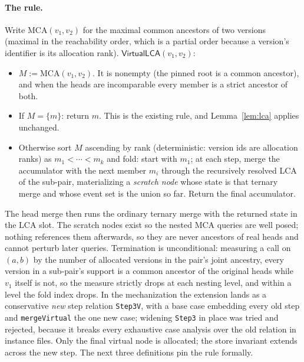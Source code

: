 \documentclass[11pt]{article}
\newcommand{\lean}[1]{\texttt{#1}}
\begin{document}
\paragraph{The rule.} Write $\mathrm{MCA}(v_1, v_2)$ for the maximal
common ancestors of two versions (maximal in the reachability order,
which is a partial order because a version's identifier is its
allocation rank). $\mathsf{VirtualLCA}(v_1, v_2)$:
\begin{itemize}[leftmargin=2em]
\item $M := \mathrm{MCA}(v_1, v_2)$. It is nonempty (the pinned root is
  a common ancestor), and when the heads are incomparable every member
  is a strict ancestor of both.
\item If $M = \{m\}$: return $m$. This is the existing rule, and
  Lemma~\ref{lem:lca} applies unchanged.
\item Otherwise sort $M$ ascending by rank (deterministic: version ids
  are allocation ranks) as $m_1 < \cdots < m_k$ and fold: start with
  $m_1$; at each step, merge the accumulator with the next member
  $m_i$ through the recursively resolved LCA of the sub-pair,
  materializing a \emph{scratch node} whose state is that ternary merge
  and whose event set is the union so far. Return the final
  accumulator.
\end{itemize}
The head merge then runs the ordinary ternary merge with the returned
state in the LCA slot. The scratch nodes exist so the nested MCA
queries are well posed; nothing references them afterwards, so they are
never ancestors of real heads and cannot perturb later queries.
Termination is unconditional: measuring a call on $(a,b)$ by the number
of allocated versions in the pair's joint ancestry, every version in a
sub-pair's support is a common ancestor of the original heads while
$v_1$ itself is not, so the measure strictly drops at each nesting
level, and within a level the fold index drops. In the mechanization
the extension lands as a conservative \emph{new} step relation
\lean{Step3V}, with a base case embedding every old step and
\lean{mergeVirtual} the one new case; widening \lean{Step3} in place
was tried and rejected, because it breaks every exhaustive case
analysis over the old relation in instance files. Only the final
virtual node is allocated; the store invariant extends across the new
step. The next three definitions pin the rule formally.
\end{document}
